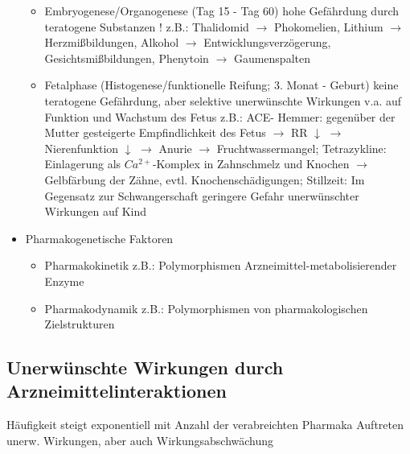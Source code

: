 \documentclass[10pt,a4paper]{report}
\begin{document}
\begin{itemize}
\begin{itemize}
		\item Embryogenese/Organogenese (Tag 15 - Tag 60) hohe Gefährdung durch teratogene Substanzen ! z.B.: Thalidomid $\rightarrow$ Phokomelien, Lithium $\rightarrow$ Herzmißbildungen, Alkohol $\rightarrow$ Entwicklungsverzögerung, Gesichtsmißbildungen,	Phenytoin $\rightarrow$ Gaumenspalten
		\item Fetalphase (Histogenese/funktionelle Reifung; 3. Monat - Geburt) keine teratogene Gefährdung, aber selektive unerwünschte Wirkungen v.a. auf Funktion und Wachstum des Fetus z.B.: 	ACE- Hemmer: gegenüber der Mutter gesteigerte Empfindlichkeit des Fetus $\rightarrow$ RR $\downarrow$ $\rightarrow$ Nierenfunktion $\downarrow$ $\rightarrow$ Anurie $\rightarrow$ Fruchtwassermangel; Tetrazykline: Einlagerung als $Ca^{2+}$-Komplex in Zahnschmelz und Knochen $\rightarrow$ Gelbfärbung der Zähne, evtl. Knochenschädigungen; Stillzeit: Im Gegensatz zur Schwangerschaft geringere Gefahr unerwünschter Wirkungen auf Kind
	\end{itemize}
	\item Pharmakogenetische Faktoren
	\begin{itemize}
		\item Pharmakokinetik	z.B.: Polymorphismen Arzneimittel-metabolisierender Enzyme
	 	\item Pharmakodynamik z.B.: Polymorphismen von pharmakologischen Zielstrukturen
	\end{itemize}
\end{itemize}
\subsection{Unerwünschte Wirkungen durch Arzneimittelinteraktionen}
Häufigkeit steigt exponentiell mit Anzahl der verabreichten Pharmaka
Auftreten unerw. Wirkungen, aber auch Wirkungsabschwächung
\end{document}
